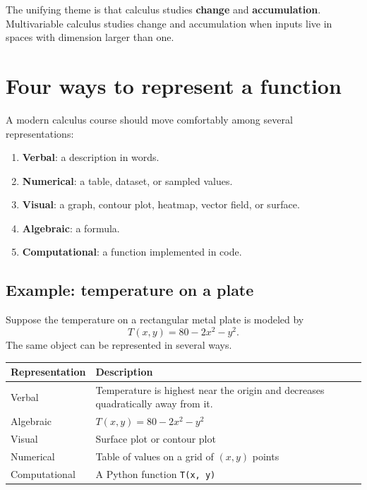 The unifying theme is that calculus studies \textbf{change} and \textbf{accumulation}. Multivariable calculus studies change and accumulation when inputs live in spaces with dimension larger than one.

\section{Four ways to represent a function}

A modern calculus course should move comfortably among several representations:
\begin{enumerate}
  \item \textbf{Verbal}: a description in words.
  \item \textbf{Numerical}: a table, dataset, or sampled values.
  \item \textbf{Visual}: a graph, contour plot, heatmap, vector field, or surface.
  \item \textbf{Algebraic}: a formula.
  \item \textbf{Computational}: a function implemented in code.
\end{enumerate}

\subsection*{Example: temperature on a plate}

Suppose the temperature on a rectangular metal plate is modeled by
\[
  T(x,y)=80-2x^2-y^2.
\]
The same object can be represented in several ways.

\begin{center}
\begin{tabularx}{0.9\textwidth}{p{}X}
\toprule
\textbf{Representation} & \textbf{Description}\\
\midrule
Verbal & Temperature is highest near the origin and decreases quadratically away from it.\\
Algebraic & $T(x,y)=80-2x^2-y^2$\\
Visual & Surface plot or contour plot\\
Numerical & Table of values on a grid of $(x,y)$ points\\
Computational & A Python function \texttt{T(x, y)}\\
\bottomrule
\end{tabularx}
\end{center}

